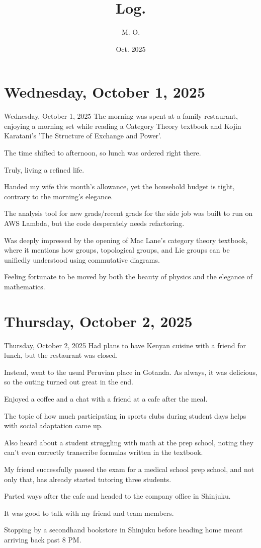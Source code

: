 \documentclass[dvipdfmx, autodetect-engine, aspectratio=169, 10.5pt]{beamer}
\title{
Log.
}
\author{
M. O.
}
\date{Oct. 2025}
\begin{document}
\maketitle

\section{Wednesday, October 1, 2025}

\begin{frame}{Wednesday, October 1, 2025}
	The morning was spent at a family restaurant, enjoying a morning set while reading a Category Theory textbook and Kojin Karatani's 'The Structure of Exchange and Power'.

	The time shifted to afternoon, so lunch was ordered right there.

	Truly, living a refined life.

	Handed my wife this month's allowance, yet the household budget is tight, contrary to the morning's elegance.

	The analysis tool for new grads/recent grads for the side job was built to run on AWS Lambda, but the code desperately needs refactoring.

	Was deeply impressed by the opening of Mac Lane's category theory textbook, where it mentions how groups, topological groups, and Lie groups can be unifiedly understood using commutative diagrams.

	Feeling fortunate to be moved by both the beauty of physics and the elegance of mathematics.
\end{frame}

\section{Thursday, October 2, 2025}

\begin{frame}{Thursday, October 2, 2025}
	Had plans to have Kenyan cuisine with a friend for lunch, but the restaurant was closed.

	Instead, went to the usual Peruvian place in Gotanda.
	As always, it was delicious, so the outing turned out great in the end.

	Enjoyed a coffee and a chat with a friend at a cafe after the meal.

	The topic of how much participating in sports clubs during student days helps with social adaptation came up.

	Also heard about a student struggling with math at the prep school, noting they can't even correctly transcribe formulas written in the textbook.

	My friend successfully passed the exam for a medical school prep school, and not only that, has already started tutoring three students.

	Parted ways after the cafe and headed to the company office in Shinjuku.

	It was good to talk with my friend and team members.

	Stopping by a secondhand bookstore in Shinjuku before heading home meant arriving back past 8 PM.
\end{frame}
\end{document}
